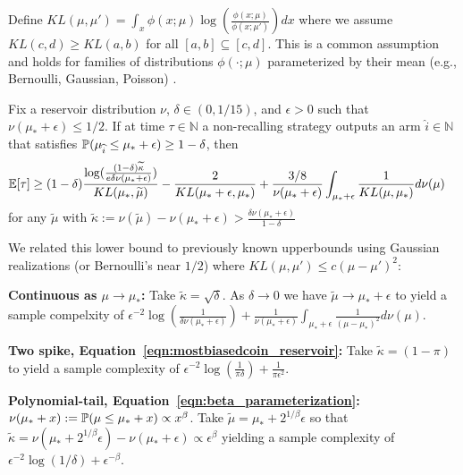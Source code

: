 Define
$KL(\mu,\mu') = \int_{x} \phi(x;\mu) \log\left( \frac{\phi(x;\mu)}{\phi(x;\mu')}\right) dx$
where we assume $KL(c,d) \geq KL(a,b)$ for all $[a,b] \subseteq [c,d]$.
This is a common assumption and holds for families of distributions $\phi( \cdot ; \mu)$ parameterized by their mean (e.g., Bernoulli, Gaussian, Poisson) \cite{kaufmann2016complexity}.
\begin{theorem}
Fix a reservoir distribution $\nu$, $\delta \in (0,1/15)$, and $\epsilon >0$ such that $\nu(\mu_*+\epsilon) \leq 1/2$.
If at time $\tau \in \mathbb{N}$ a non-recalling strategy outputs an arm $\widehat{i} \in \mathbb{N}$ that satisfies $\P(\mu_{\widehat{i}} \leq \mu_* + \epsilon ) \geq 1-\delta$, then
\begin{align*}
\E[ \tau ] &\geq (1-\delta)\frac{  \log(\tfrac{(1-\delta)\widetilde{\kappa}}{e \delta \nu(\mu_*+\epsilon)})}{KL(\mu_* , \widetilde{\mu})}  - \frac{2}{KL(\mu_* + \epsilon, \mu_*)}  + \frac{3/8}{\nu(\mu_*+\epsilon)} \int_{\mu_*+\epsilon} \frac{1}{KL(\mu,\mu_*)} d\nu(\mu) 
\end{align*}
for any $\widetilde{\mu}$ with $\widetilde{\kappa} := \nu(\widetilde{\mu}) - \nu(\mu_*+\epsilon) > \frac{ \delta \nu(\mu_*+\epsilon)}{1-\delta}$
\end{theorem}


\noindent We related this lower bound to previously known upperbounds using Gaussian realizations (or Bernoulli's near $1/2$) where $KL(\mu,\mu') \leq c (\mu-\mu')^2$: 

\noindent\textbf{Continuous as $\mu \rightarrow \mu_*$:} Take $\widetilde{\kappa} = \sqrt{\delta}$. As $\delta \rightarrow 0$ we have $\widetilde{\mu} \rightarrow \mu_*+\epsilon$ to yield a sample compelxity of $\epsilon^{-2} \log(\tfrac{1}{ \delta \nu(\mu_*+\epsilon)}) + \frac{1}{\nu(\mu_*+\epsilon)} \int_{\mu_*+\epsilon} \frac{1}{(\mu-\mu_*)^2} d\nu(\mu)$.

\noindent\textbf{Two spike, Equation~\ref{eqn:mostbiasedcoin_reservoir}:} Take $\widetilde{\kappa} = (1-\pi)$ to yield a sample complexity of $\epsilon^{-2} \log(\tfrac{1}{\pi \delta}) + \frac{1}{\pi \epsilon^2}$.

\noindent\textbf{Polynomial-tail, Equation~\ref{eqn:beta_parameterization}:} $\nu(\mu_* + x) := \P( \mu \leq \mu_* + x) \propto x^\beta$. Take $\widetilde{\mu} = \mu_* + 2^{1/\beta} \epsilon$ so that $\widetilde{\kappa} = \nu(\mu_*+2^{1/\beta} \epsilon) - \nu(\mu_* + \epsilon) \propto \epsilon^\beta$ yielding a sample complexity of $\epsilon^{-2}\log(1/\delta) + \epsilon^{-\beta}$.

